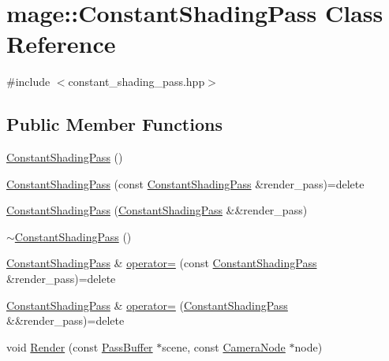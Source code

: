\hypertarget{classmage_1_1_constant_shading_pass}{}\section{mage\+:\+:Constant\+Shading\+Pass Class Reference}
\label{classmage_1_1_constant_shading_pass}


{\ttfamily \#include $<$constant\+\_\+shading\+\_\+pass.\+hpp$>$}

\subsection*{Public Member Functions}
\begin{DoxyCompactItemize}
\item 
\hyperlink{classmage_1_1_constant_shading_pass_a21a8614cd67999bec82d260eb9aa78d7}{Constant\+Shading\+Pass} ()
\item 
\hyperlink{classmage_1_1_constant_shading_pass_a0dd8af518c8f6444368d64f9e24a3a13}{Constant\+Shading\+Pass} (const \hyperlink{classmage_1_1_constant_shading_pass}{Constant\+Shading\+Pass} \&render\+\_\+pass)=delete
\item 
\hyperlink{classmage_1_1_constant_shading_pass_afeb558851130d64579930be81198e946}{Constant\+Shading\+Pass} (\hyperlink{classmage_1_1_constant_shading_pass}{Constant\+Shading\+Pass} \&\&render\+\_\+pass)
\item 
\hyperlink{classmage_1_1_constant_shading_pass_a2ef56dc45910519d5e0137b14768738e}{$\sim$\+Constant\+Shading\+Pass} ()
\item 
\hyperlink{classmage_1_1_constant_shading_pass}{Constant\+Shading\+Pass} \& \hyperlink{classmage_1_1_constant_shading_pass_ada08b06e66c1d1da2f869b96b71f3202}{operator=} (const \hyperlink{classmage_1_1_constant_shading_pass}{Constant\+Shading\+Pass} \&render\+\_\+pass)=delete
\item 
\hyperlink{classmage_1_1_constant_shading_pass}{Constant\+Shading\+Pass} \& \hyperlink{classmage_1_1_constant_shading_pass_ae5ea38d9739b1a16257ee0a69c95b406}{operator=} (\hyperlink{classmage_1_1_constant_shading_pass}{Constant\+Shading\+Pass} \&\&render\+\_\+pass)=delete
\item 
void \hyperlink{classmage_1_1_constant_shading_pass_a0900c426f0c4c427d81d8035c2c30f3f}{Render} (const \hyperlink{structmage_1_1_pass_buffer}{Pass\+Buffer} $\ast$scene, const \hyperlink{classmage_1_1_camera_node}{Camera\+Node} $\ast$node)
\end{DoxyCompactItemize}
